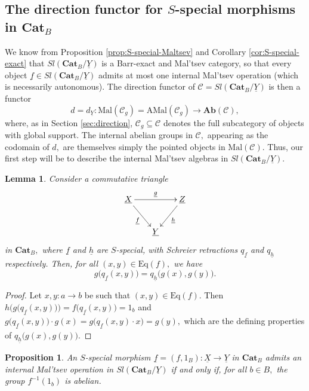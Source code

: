 \documentclass[11pt]{amsart}
\theoremstyle{plain}
\newtheorem{lemma}[subsubsection]{Lemma}
\newtheorem{proposition}[subsubsection]{Proposition}
\theoremstyle{definition}
\theoremstyle{remark}
\newcommand{\un}{\underline}
\begin{document}
\subsection{The direction functor for $S$-special morphisms in $\mathbf{Cat}_B$}
We know from Proposition \ref{prop:S-special-Maltsev} and Corollary \ref{cor:S-special-exact} that $Sl(\mathbf{Cat}_B/\underline{Y})$ is a Barr-exact and Mal'tsev category, so that every object $\underline{f}\in Sl(\mathbf{Cat}_B/\underline{Y})$ admits at most one internal Mal'tsev operation (which is necessarily autonomous). The direction functor of $\mathcal{C}=Sl(\mathbf{Cat}_B/\underline{Y})$ is then a functor
\[
d=d_{\un{Y}}\colon\mathrm{Mal}(\mathcal{C}_g)=\mathrm{AMal}(\mathcal{C}_g)\longrightarrow \mathbf{Ab}(\mathcal{C}),
\]
where, as in Section \ref{sec:direction}, $\mathcal{C}_g\subseteq\mathcal{C}$ denotes the full subcategory of objects with global support. The internal abelian groups in $\mathcal{C},$ appearing as the codomain of $d,$ are themselves simply the pointed objects in $\mathrm{Mal}(\mathcal{C}).$ Thus, our first step will be to describe the internal Mal'tsev algebras in $Sl(\mathbf{Cat}_B/\underline{Y}).$
\begin{lemma}
\label{lemma:q_comp}
Consider a commutative triangle
\begin{equation*}
\xymatrixcolsep{1.5pc}
\xymatrix{
{\un{X}} \ar[rr]^-{\un{g}} \ar[rd]_-{\un{f}}  &\ &{\un{Z}} \ar[ld]^-{\un{h}} \\
&{\un{Y}} &\
}
\end{equation*}
in $\mathbf{Cat}_B,$ where $\un{f}$ and $\un{h}$ are $S$-special, with Schreier retractions $q_{\un{f}}$ and $q_{\un{h}}$ respectively. Then, for all $(x,y)\in\mathrm{Eq}(f),$ we have
\[
g\big(q_{\un{f}}(x,y)\big)=q_{\un{h}}\big(g(x),g(y)\big).
\]
\end{lemma}
\begin{proof}
Let $x,y\colon a\rightarrow b$ be such that $(x,y)\in\mathrm{Eq}(f).$ Then $h\Big(g\big(q_{\un{f}}(x,y)\big)\Big)=f\big(q_{\un{f}}(x,y)\big)=1_b$ and $g\big(q_{\un{f}}(x,y)\big)\cdot g(x)=g\big(q_{\un{f}}(x,y)\cdot x\big)=g(y),$ which are the defining properties of $q_{\un{h}}\big(g(x),g(y)\big).$
\end{proof}
\begin{proposition}
\label{prop:char_mal'tsev_objects_slice}
An $S$-special morphism $\un{f}=(f,1_B)\colon\un{X}\rightarrow\un{Y}$ in $\mathbf{Cat}_B$ admits an internal Mal'tsev operation in $Sl(\mathbf{Cat}_B/\underline{Y})$ if and only if, for all $b\in B,$ the group $f^{-1}(1_b)$ is abelian.
\end{proposition}
\end{document}
